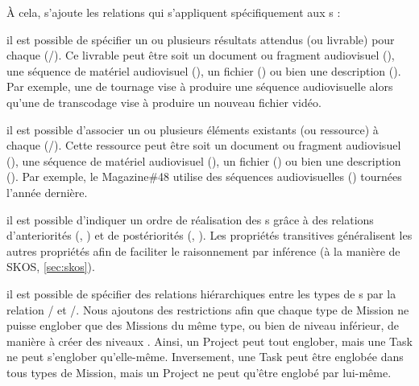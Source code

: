 À cela, s'ajoute les relations qui s'appliquent spécifiquement aux s : 
\begin{liste}
	\item il est possible de spécifier un ou plusieurs résultats attendus (ou livrable) pour chaque  (/).
	Ce livrable peut être soit un document ou fragment audiovisuel (), une séquence de matériel audiovisuel (), un fichier () ou bien une description ().
	Par exemple, une  de tournage vise à produire une séquence audiovisuelle alors qu'une  de transcodage vise à produire un nouveau fichier vidéo.

	\item il est possible d'associer un ou plusieurs éléments existants (ou ressource) à chaque  (/). 
	Cette ressource peut être soit un document ou fragment audiovisuel (), une séquence de matériel audiovisuel (), un fichier () ou bien une description ().
	Par exemple, le  Magazine\#48 utilise des séquences audiovisuelles () tournées l'année dernière.

	\item il est possible d'indiquer un ordre de réalisation des s grâce à des relations d'anteriorités (, ) et de postériorités (, ).
	Les propriétés transitives généralisent les autres propriétés afin de faciliter le raisonnement par inférence (à la manière de SKOS, \ref{sec:skos}).

	\item il est possible de spécifier des relations hiérarchiques entre les types de s par la relation / et /.
	Nous ajoutons des restrictions afin que chaque type de Mission ne puisse englober que des Missions du même type, ou bien de niveau inférieur, de manière à créer des niveaux . 
	Ainsi, un Project peut tout englober, mais une Task ne peut s'englober qu'elle-même. 
	Inversement, une Task peut être englobée dans tous types de Mission, mais un Project ne peut qu'être englobé par lui-même.
\end{liste}





